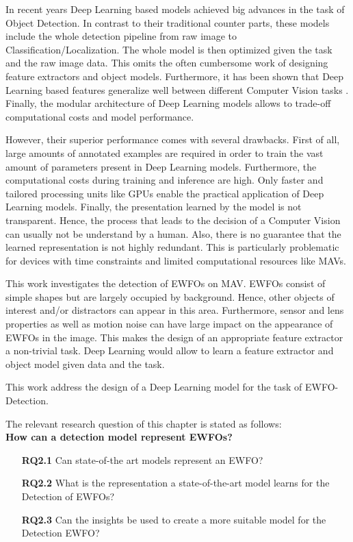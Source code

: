 	In recent years Deep Learning based models achieved big advances in the task of Object Detection. In contrast to their traditional counter parts, these models include the whole detection pipeline from raw image to Classification/Localization. The whole model is then optimized given the task and the raw image data. This omits the often cumbersome work of designing feature extractors and object models. Furthermore, it has been shown that Deep Learning based features generalize well between different Computer Vision tasks \cite{Razavian}. Finally, the modular architecture of Deep Learning models allows to trade-off computational costs and model performance.
	
	However, their superior performance comes with several drawbacks. First of all, large amounts of annotated examples are required in order to train the vast amount of parameters present in Deep Learning models. Furthermore, the computational costs during training and inference are high. Only faster and tailored processing units like \acp{GPU} enable the practical application of Deep Learning models. Finally, the presentation learned by the model is not transparent. Hence, the process that leads to the decision of a Computer Vision can usually not be understand by a human. Also, there is no guarantee that the learned representation is not highly redundant. This is particularly problematic for devices with time constraints and limited computational resources like \acp{MAV}.
	
	This work investigates the detection of \acp{EWFO} on \ac{MAV}. \acp{EWFO} consist of simple shapes but are largely occupied by background. Hence, other objects of interest and/or distractors can appear in this area. Furthermore, sensor and lens properties as well as motion noise can have large impact on the appearance of \acp{EWFO} in the image. This makes the design of an appropriate feature extractor a non-trivial task. Deep Learning would allow to learn a feature extractor and object model given data and the task.
	
	This work address the design of a Deep Learning model for the task of \ac{EWFO}-Detection.
	
	The relevant research question of this chapter is stated as follows:\\
	\textbf{How can a detection model represent \acp{EWFO}?}
	
	\begin{enumerate}
		\item[\textbf{RQ2.1}] Can state-of-the art models represent an \ac{EWFO}?
		\item[\textbf{RQ2.2}] What is the representation a state-of-the-art model learns for the Detection of \acp{EWFO}?
		\item[\textbf{RQ2.3}] Can the insights be used to create a more suitable model for the Detection \ac{EWFO}?
	\end{enumerate}

